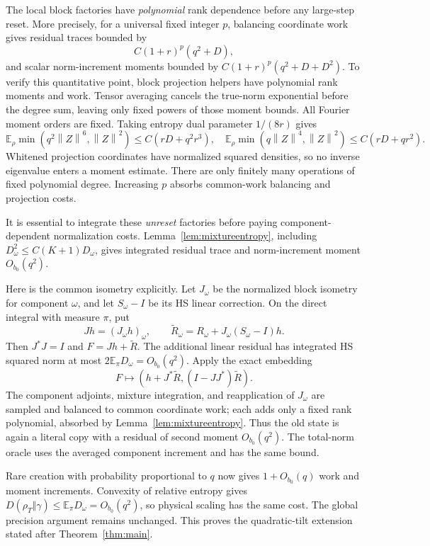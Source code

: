 \documentclass[11pt]{article}
\newcommand{\E}{\mathbb E}
\newcommand{\norm}[1]{\left\lVert #1\right\rVert}
\begin{document}
The local block factories have \emph{polynomial} rank dependence before any large-step reset. More precisely, for a universal fixed integer $p$, balancing coordinate work gives residual traces bounded by
\[
 C(1+r)^p(q^2+D),
\]
and scalar norm-increment moments bounded by $C(1+r)^p(q^2+D+D^2)$. To verify this quantitative point, block projection helpers have polynomial rank moments and work. Tensor averaging cancels the true-norm exponential before the degree sum, leaving only fixed powers of those moment bounds. All Fourier moment orders are fixed. Taking entropy dual parameter $1/(8r)$ gives
\[
 \E_\rho\min(q^2\norm Z^6,\norm Z^2)\le C(rD+q^2r^3),\quad
 \E_\rho\min(q\norm Z^4,\norm Z^2)\le C(rD+qr^2).
\]
Whitened projection coordinates have normalized squared densities, so no inverse eigenvalue enters a moment estimate. There are only finitely many operations of fixed polynomial degree. Increasing $p$ absorbs common-work balancing and projection costs.

It is essential to integrate these \emph{unreset} factories before paying component-dependent normalization costs. Lemma~\ref{lem:mixtureentropy}, including $D_\omega^2\le C(K+1)D_\omega$, gives integrated residual trace and norm-increment moment $O_{b_0}(q^2)$.

Here is the common isometry explicitly. Let $J_\omega$ be the normalized block isometry for component $\omega$, and let $S_\omega-I$ be its HS linear correction. On the direct integral with measure $\pi$, put
\[
 Jh=(J_\omega h)_\omega,\qquad
 \widetilde R_\omega=R_\omega+J_\omega(S_\omega-I)h.
\]
Then $J^*J=I$ and $F=Jh+\widetilde R$. The additional linear residual has integrated HS squared norm at most $2\E_\pi D_\omega=O_{b_0}(q^2)$. Apply the exact embedding
\[
 F\longmapsto(h+J^*\widetilde R,(I-JJ^*)\widetilde R).
\]
The component adjoints, mixture integration, and reapplication of $J_\omega$ are sampled and balanced to common coordinate work; each adds only a fixed rank polynomial, absorbed by Lemma~\ref{lem:mixtureentropy}. Thus the old state is again a literal copy with a residual of second moment $O_{b_0}(q^2)$. The total-norm oracle uses the averaged component increment and has the same bound.

Rare creation with probability proportional to $q$ now gives $1+O_{b_0}(q)$ work and moment increments. Convexity of relative entropy gives $D(\rho_T\Vert\gamma)\le\E_\pi D_\omega=O_{b_0}(q^2)$, so physical scaling has the same cost. The global precision argument remains unchanged. This proves the quadratic-tilt extension stated after Theorem~\ref{thm:main}.
\end{document}
